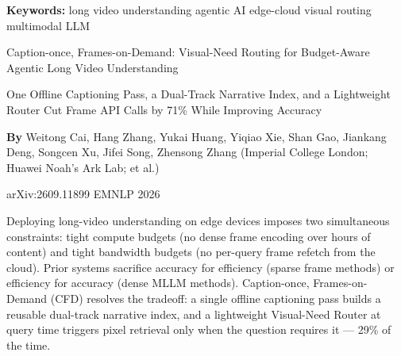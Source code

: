 \documentclass[10pt,twocolumn]{article}
\begin{document}
\setlength{\parindent}{0pt}
\setlength{\parskip}{4pt}

{\small\color{keywordgray}\textbf{Keywords:}
  long video understanding \textbullet{}
  agentic AI \textbullet{}
  edge-cloud \textbullet{}
  visual routing \textbullet{}
  multimodal LLM}\par\vspace{4pt}

{\LARGE\bfseries\raggedright
  Caption-once, Frames-on-Demand:
  Visual-Need Routing for Budget-Aware
  Agentic Long Video Understanding}\par\vspace{4pt}

{\large\itshape\raggedright
  One Offline Captioning Pass, a Dual-Track Narrative Index,
  and a Lightweight Router Cut Frame API Calls by 71\%
  While Improving Accuracy}\par\vspace{6pt}

{\small\textbf{By} Weitong Cai, Hang Zhang, Yukai Huang,
  Yiqiao Xie, Shan Gao, Jiankang Deng, Songcen Xu,
  Jifei Song, Zhensong Zhang
  (Imperial College London; Huawei Noah's Ark Lab; et al.)}\par\vspace{2pt}

{\small\color{keywordgray}arXiv:2609.11899 \textbullet{} EMNLP 2026}
\par\vspace{2pt}\noindent{\color{rulered}\rule{\columnwidth}{0.6pt}}\vspace{6pt}

Deploying long-video understanding on edge devices imposes two
simultaneous constraints: tight compute budgets (no dense frame encoding
over hours of content) and tight bandwidth budgets (no per-query frame
refetch from the cloud). Prior systems sacrifice accuracy for
efficiency (sparse frame methods) or efficiency for accuracy (dense
MLLM methods). Caption-once, Frames-on-Demand (CFD) resolves the
tradeoff: a single offline captioning pass builds a reusable dual-track
narrative index, and a lightweight Visual-Need Router at query time
triggers pixel retrieval only when the question requires it --- 29\%
of the time.
\end{document}
